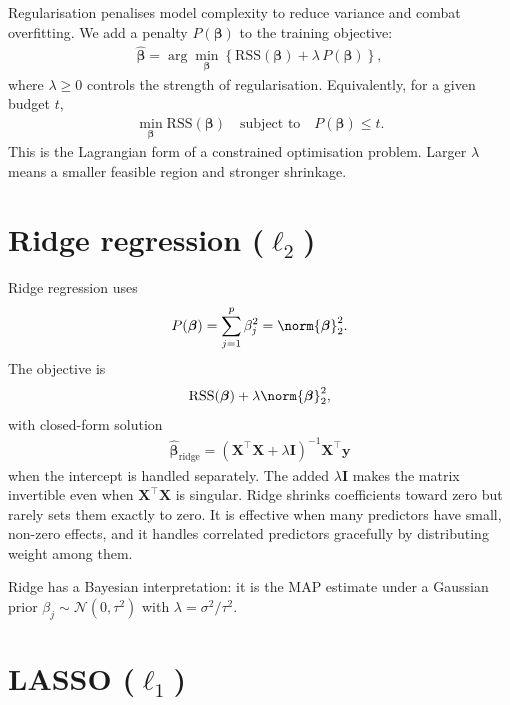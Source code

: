 \documentclass[a4paper, 12pt]{book}
\begin{document}
Regularisation penalises model complexity to reduce variance and combat overfitting.
We add a penalty $P(\boldsymbol{\beta})$ to the training objective:
\begin{align}
    \hat{\boldsymbol{\beta}}
    = \arg\min_{\boldsymbol{\beta}}
      \left\{ \mathrm{RSS}(\boldsymbol{\beta})
      + \lambda\,P(\boldsymbol{\beta}) \right\},
\end{align}
where $\lambda \geq 0$ controls the strength of regularisation. Equivalently, for a
given budget $t$,
\begin{align}
    \min_{\boldsymbol{\beta}} \mathrm{RSS}(\boldsymbol{\beta})
    \quad \text{subject to} \quad P(\boldsymbol{\beta}) \leq t.
\end{align}
This is the Lagrangian form of a constrained optimisation problem. Larger $\lambda$
means a smaller feasible region and stronger shrinkage.

\section{Ridge regression ($\ell_2$)}

Ridge regression uses
\begin{align}
    P(\boldsymbol{\beta}) = \sum_{j=1}^p \beta_j^2 = \norm{\boldsymbol{\beta}}_2^2.
\end{align}
The objective is
\begin{align}
    \mathrm{RSS}(\boldsymbol{\beta}) + \lambda\norm{\boldsymbol{\beta}}_2^2,
\end{align}
with closed-form solution
\begin{align}
    \hat{\boldsymbol{\beta}}_{\mathrm{ridge}}
    = (\mathbf{X}^\top\mathbf{X} + \lambda\mathbf{I})^{-1}\mathbf{X}^\top\mathbf{y}
\end{align}
when the intercept is handled separately. The added $\lambda\mathbf{I}$ makes the
matrix invertible even when $\mathbf{X}^\top\mathbf{X}$ is singular. Ridge shrinks
coefficients toward zero but rarely sets them exactly to zero. It is effective when
many predictors have small, non-zero effects, and it handles correlated predictors
gracefully by distributing weight among them.

Ridge has a Bayesian interpretation: it is the MAP estimate under a Gaussian prior
$\beta_j \sim \mathscr{N}(0,\tau^2)$ with $\lambda = \sigma^2/\tau^2$.

\section{LASSO ($\ell_1$)}
\end{document}
